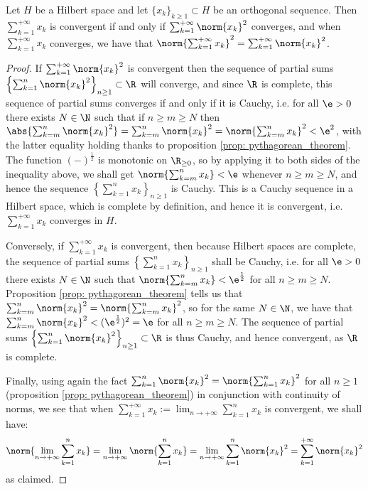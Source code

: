         \begin{lemma} \label{lemma: convergent_orthogonal_series_in_hilbert_spaces}
            Let $H$ be a Hilbert space and let $\{x_k\}_{k \geq 1} \subset H$ be an orthogonal sequence. Then $\sum_{k = 1}^{+\infty} x_k$ is convergent if and only if $\sum_{k = 1}^{+\infty} \norm{x_k}^2$ converges, and when $\sum_{k = 1}^{+\infty} x_k$ converges, we have that $\norm{ \sum_{k = 1}^{+\infty} x_k }^2 = \sum_{k = 1}^{+\infty} \norm{x_k}^2$.
        \end{lemma}
            \begin{proof}
                If $\sum_{k = 1}^{+\infty} \norm{x_k}^2$ is convergent then the sequence of partial sums $\left\{ \sum_{k = 1}^n \norm{x_k}^2 \right\}_{n \geq 1} \subset \R$ will converge, and since $\R$ is complete, this sequence of partial sums converges if and only if it is Cauchy, i.e. for all $\e > 0$ there exists $N \in \N$ such that if $n \geq m \geq N$ then $\abs{ \sum_{k = m}^n \norm{x_k}^2 } = \sum_{k = m}^n \norm{x_k}^2 = \norm{ \sum_{k = m}^n x_k }^2 < \e^2$, with the latter equality holding thanks to proposition \ref{prop: pythagorean_theorem}. The function $(-)^{\frac12}$ is monotonic on $\R_{\geq 0}$, so by applying it to both sides of the inequality above, we shall get $\norm{\sum_{k = m}^n x_k} < \e$ whenever $n \geq m \geq N$, and hence the sequence $\left\{ \sum_{k = 1}^n x_k \right\}_{n \geq 1}$ is Cauchy. This is a Cauchy sequence in a Hilbert space, which is complete by definition, and hence it is convergent, i.e. $\sum_{k = 1}^{+\infty} x_k$ converges in $H$.

                Conversely, if $\sum_{k = 1}^{+\infty} x_k$ is convergent, then because Hilbert spaces are complete, the sequence of partial sums $\left\{ \sum_{k = 1}^n x_k \right\}_{n \geq 1}$ shall be Cauchy, i.e. for all $\e > 0$ there exists $N \in \N$ such that $\norm{ \sum_{k = m}^n x_k } < \e^{\frac12}$ for all $n \geq m \geq N$. Proposition \ref{prop: pythagorean_theorem} tells us that $\sum_{k = m}^n \norm{x_k}^2 = \norm{\sum_{k = m}^n x_k}^2$, so for the same $N \in \N$, we have that $\sum_{k = m}^n \norm{x_k}^2 < (\e^{\frac12})^2 = \e$ for all $n \geq m \geq N$. The sequence of partial sums $\left\{ \sum_{k = 1}^n \norm{x_k}^2 \right\}_{n \geq 1} \subset \R$ is thus Cauchy, and hence convergent, as $\R$ is complete.

                Finally, using again the fact $\sum_{k = 1}^n \norm{x_k}^2 = \norm{\sum_{k = 1}^n x_k}^2$ for all $n \geq 1$ (proposition \ref{prop: pythagorean_theorem}) in conjunction with continuity of norms, we see that when $\sum_{k = 1}^{+\infty} x_k := \lim_{n \to +\infty} \sum_{k = 1}^n x_k$ is convergent, we shall have:
                    $$\norm{\lim_{n \to +\infty} \sum_{k = 1}^n x_k} = \lim_{n \to +\infty} \norm{\sum_{k = 1}^n x_k} = \lim_{n \to +\infty} \sum_{k = 1}^n \norm{x_k}^2 = \sum_{k = 1}^{+\infty} \norm{x_k}^2$$
                as claimed.
            \end{proof}


